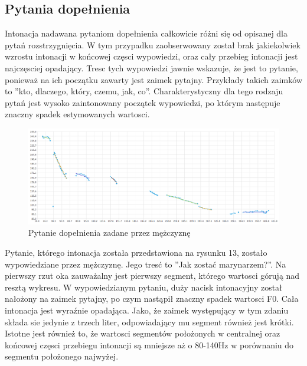 \documentclass[a4paper,12 pt]{article}
\begin{document}
\subsection{Pytania dopełnienia}
Intonacja nadawana pytaniom dopełnienia całkowicie różni się od opisanej dla pytań rozstrzygnięcia. W tym przypadku zaobserwowany został brak jakiekolwiek wzrostu intonacji w końcowej częsci wypowiedzi, oraz cały przebieg intonacji jest najczęsciej opadający. Tresc tych wypowiedzi jawnie wskazuje, że jest to pytanie, ponieważ na ich początku zawarty jest zaimek pytajny. Przykłady takich zaimków to ''kto, dlaczego, który, czemu, jak, co''. Charakterystyczny dla tego rodzaju pytań jest wysoko zaintonowany początek wypowiedzi,  po którym następuje znaczny spadek estymowanych wartosci.
 \FloatBarrier
\begin{figure}[h]
\centering
\includegraphics[scale=0.6]{pytanie_uzupelnienia_marynarz.png}
\caption{Pytanie dopełnienia zadane przez mężczyznę}
\end{figure}
\FloatBarrier
Pytanie, którego intonacja została przedstawiona na rysunku 13, zostało wypowiedziane przez mężczyznę. Jego tresć to ''Jak zostać marynarzem?''. Na pierwszy rzut oka zauważalny jest pierwszy segment, którego wartosci górują nad resztą wykresu. W wypowiedzianym pytaniu, duży nacisk intonacyjny został nałożony na zaimek pytajny, po czym nastąpił znaczny spadek wartosci F0. Cała intonacja jest wyraźnie opadająca. Jako, że zaimek występujący w tym zdaniu składa sie jedynie z trzech liter, odpowiadający mu segment również jest krótki. Istotne jest również to, że wartosci segmentów położonych w centralnej oraz końcowej częsci przebiegu intonacji są mniejsze aż o 80-140Hz w porównaniu do segmentu położonego najwyżej.
\end{document}
